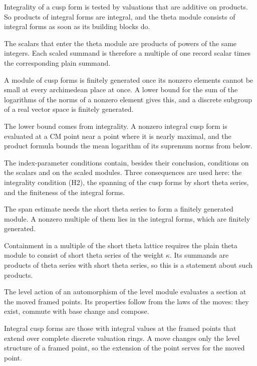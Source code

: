 Integrality of a cusp form is tested by valuations that are additive on products. So products of
integral forms are integral, and the theta module consists of integral forms as soon as its building
blocks do.

The scalars that enter the theta module are products of powers of the same integers. Each scaled
summand is therefore a multiple of one record scalar times the corresponding plain summand.

A module of cusp forms is finitely generated once its nonzero elements cannot be small at every
archimedean place at once. A lower bound for the sum of the logarithms of the norms of a nonzero element
gives this, and a discrete subgroup of a real vector space is finitely generated.

The lower bound comes from integrality. A nonzero integral cusp form is evaluated at a CM point near a
point where it is nearly maximal, and the product formula bounds the mean logarithm of its supremum
norms from below.

The index-parameter conditions contain, besides their conclusion, conditions on the scalars and on
the scaled modules. Three consequences are used here: the integrality condition (H2), the spanning
of the cusp forms by short theta series, and the finiteness of the integral forms.

The span estimate needs the short theta series to form a finitely generated module. A nonzero
multiple of them lies in the integral forms, which are finitely generated.

Containment in a multiple of the short theta lattice requires the plain theta module to consist of
short theta series of the weight $\kappa$. Its summands are products of theta series with short
theta series, so this is a statement about such products.

The level action of an automorphism of the level module evaluates a section at the moved framed
points. Its properties follow from the laws of the moves: they exist, commute with base change and
compose.

Integral cusp forms are those with integral values at the framed points that extend over complete
discrete valuation rings. A move changes only the level structure of a framed point, so the extension
of the point serves for the moved point.

